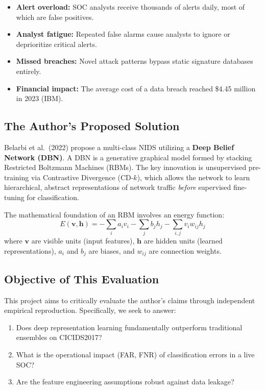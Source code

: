 \documentclass[11pt,a4paper]{article}
\begin{document}
\begin{itemize}[nosep]
    \item \textbf{Alert overload:} SOC analysts receive thousands of alerts daily, most of which are false positives.
    \item \textbf{Analyst fatigue:} Repeated false alarms cause analysts to ignore or deprioritize critical alerts.
    \item \textbf{Missed breaches:} Novel attack patterns bypass static signature databases entirely.
    \item \textbf{Financial impact:} The average cost of a data breach reached \$4.45 million in 2023 (IBM).
\end{itemize}

\subsection{The Author's Proposed Solution}
Belarbi et al.\ (2022) propose a multi-class NIDS utilizing a \textbf{Deep Belief Network (DBN)}. A DBN is a generative graphical model formed by stacking Restricted Boltzmann Machines (RBMs). The key innovation is unsupervised pre-training via Contrastive Divergence (CD-$k$), which allows the network to learn hierarchical, abstract representations of network traffic \textit{before} supervised fine-tuning for classification.

The mathematical foundation of an RBM involves an energy function:
\begin{equation}
    E(\mathbf{v}, \mathbf{h}) = -\sum_i a_i v_i - \sum_j b_j h_j - \sum_{i,j} v_i w_{ij} h_j
\end{equation}
where $\mathbf{v}$ are visible units (input features), $\mathbf{h}$ are hidden units (learned representations), $a_i$ and $b_j$ are biases, and $w_{ij}$ are connection weights.

\subsection{Objective of This Evaluation}
This project aims to critically evaluate the author's claims through independent empirical reproduction. Specifically, we seek to answer:
\begin{enumerate}[nosep]
    \item Does deep representation learning fundamentally outperform traditional ensembles on CICIDS2017?
    \item What is the operational impact (FAR, FNR) of classification errors in a live SOC?
    \item Are the feature engineering assumptions robust against data leakage?
\end{enumerate}
\end{document}
